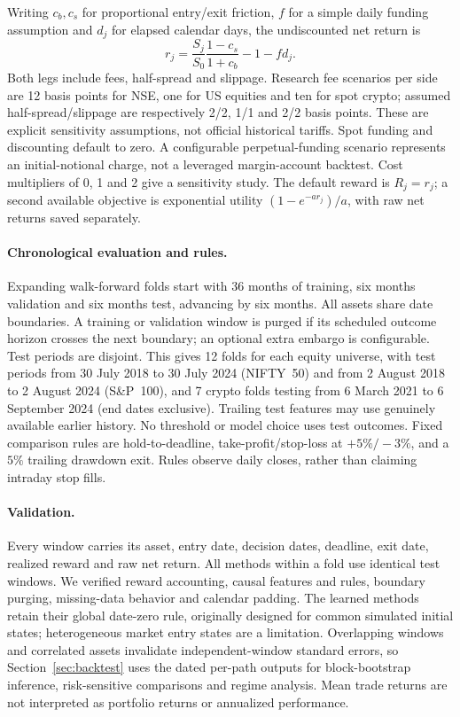 Writing $c_b,c_s$ for proportional entry/exit friction, $f$ for a simple daily funding
assumption and $d_j$ for elapsed calendar days, the undiscounted net return is
\[
 r_j=\frac{S_j}{S_0}\frac{1-c_s}{1+c_b}-1-fd_j.
\]
Both legs include fees, half-spread and slippage. Research fee scenarios per side are
12 basis points for NSE, one for US equities and ten for spot crypto; assumed
half-spread/slippage are respectively 2/2, 1/1 and 2/2 basis points. These are explicit
sensitivity assumptions, not official historical tariffs. Spot funding and discounting
default to zero. A configurable perpetual-funding scenario represents an initial-notional
charge, not a leveraged margin-account backtest. Cost multipliers of 0, 1 and 2 give a
sensitivity study. The default reward is $R_j=r_j$; a second available
objective is exponential utility $(1-e^{-a r_j})/a$, with raw net returns saved separately.

\paragraph{Chronological evaluation and rules.}
Expanding walk-forward folds start with 36 months of training, six months validation
and six months test, advancing by six months. All assets share date boundaries.
A training or validation window is purged if its scheduled outcome horizon crosses
the next boundary; an optional extra embargo is configurable. Test periods are disjoint.
This gives 12 folds for each equity universe, with test periods from 30 July 2018 to
30 July 2024 (NIFTY~50) and from 2 August 2018 to 2 August 2024 (S\&P~100), and 7 crypto
folds testing from 6 March 2021 to 6 September 2024 (end dates exclusive).
Trailing test features may use genuinely available earlier history. No threshold or
model choice uses test outcomes. Fixed comparison rules are hold-to-deadline,
take-profit/stop-loss at $+5\%/-3\%$, and a $5\%$ trailing drawdown exit. Rules observe
daily closes, rather than claiming intraday stop fills.

\paragraph{Validation.}
Every window carries its asset, entry date, decision dates, deadline, exit date, realized
reward and raw net return. All methods within a fold use identical test windows. We
verified reward accounting, causal features and rules, boundary purging, missing-data
behavior and calendar padding. The learned methods retain
their global date-zero rule, originally designed for common simulated initial states;
heterogeneous market entry states are a limitation. Overlapping windows and correlated
assets invalidate independent-window standard errors, so Section~\ref{sec:backtest} uses
the dated per-path outputs for block-bootstrap inference, risk-sensitive comparisons and
regime analysis.
Mean trade returns are not interpreted as portfolio returns or annualized performance.
